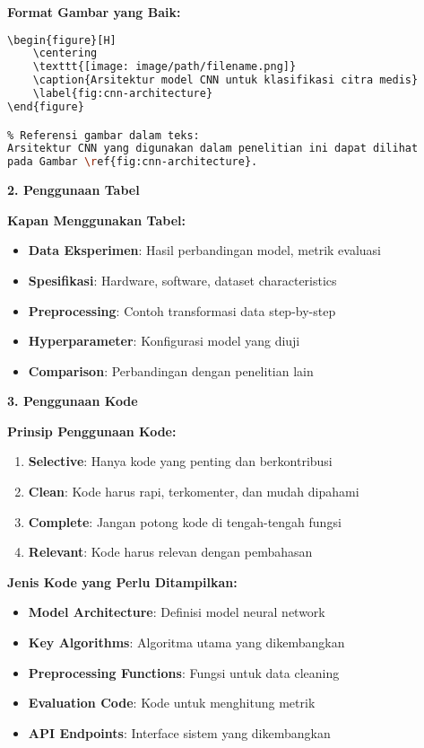 \textbf{Format Gambar yang Baik:}
\begin{lstlisting}[language=bash, style=bash, caption=Best Practice Gambar dalam LaTeX]
\begin{figure}[H]
    \centering
    \texttt{[image: image/path/filename.png]}
    \caption{Arsitektur model CNN untuk klasifikasi citra medis}
    \label{fig:cnn-architecture}
\end{figure}

% Referensi gambar dalam teks:
Arsitektur CNN yang digunakan dalam penelitian ini dapat dilihat
pada Gambar \ref{fig:cnn-architecture}.
\end{lstlisting}

\textbf{2. Penggunaan Tabel}

\textbf{Kapan Menggunakan Tabel:}
\begin{itemize}
    \item \textbf{Data Eksperimen}: Hasil perbandingan model, metrik evaluasi
    \item \textbf{Spesifikasi}: Hardware, software, dataset characteristics
    \item \textbf{Preprocessing}: Contoh transformasi data step-by-step
    \item \textbf{Hyperparameter}: Konfigurasi model yang diuji
    \item \textbf{Comparison}: Perbandingan dengan penelitian lain
\end{itemize}

\textbf{3. Penggunaan Kode}

\textbf{Prinsip Penggunaan Kode:}
\begin{enumerate}
    \item \textbf{Selective}: Hanya kode yang penting dan berkontribusi
    \item \textbf{Clean}: Kode harus rapi, terkomenter, dan mudah dipahami
    \item \textbf{Complete}: Jangan potong kode di tengah-tengah fungsi
    \item \textbf{Relevant}: Kode harus relevan dengan pembahasan
\end{enumerate}

\textbf{Jenis Kode yang Perlu Ditampilkan:}
\begin{itemize}
    \item \textbf{Model Architecture}: Definisi model neural network
    \item \textbf{Key Algorithms}: Algoritma utama yang dikembangkan
    \item \textbf{Preprocessing Functions}: Fungsi untuk data cleaning
    \item \textbf{Evaluation Code}: Kode untuk menghitung metrik
    \item \textbf{API Endpoints}: Interface sistem yang dikembangkan
\end{itemize}

